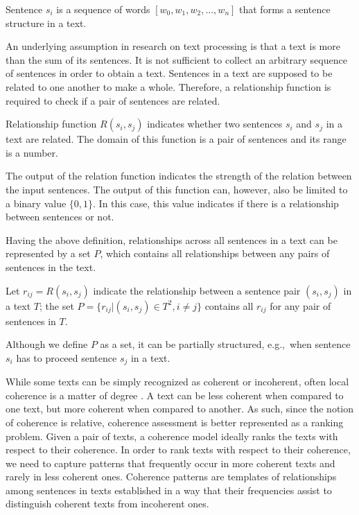 \begin{definition}
Sentence $s_i$ is a sequence of words $[w_0, w_1, w_2, ... , w_n]$ that forms a sentence structure in a text. 
\end{definition}

An underlying assumption in research on text processing is that a text is more than the sum of its sentences. 
It is not sufficient to collect an arbitrary sequence of sentences in order to obtain a text. 
Sentences in a text are supposed to be related to one another to make a whole. 
Therefore, a relationship function is required to check if a pair of sentences are related. 

\begin{definition}
Relationship function $R(s_i,s_j)$ indicates whether two sentences $s_i$ and $s_j$ in a text are related. 
The domain of this function is a pair of sentences and its range is a number. 
\end{definition} 

The output of the relation function indicates the strength of the relation between the input sentences.  
The output of this function can, however, also be limited to a binary value $\lbrace 0,1\rbrace$. 
In this case, this value indicates if there is a relationship between sentences or not. 

Having the above definition, relationships across all sentences in a text can be represented by a set $P$, which contains all relationships between any pairs of sentences in the text. 

\begin{definition}
Let $r_{ij}= R(s_i,s_j)$ indicate the relationship between a sentence pair $(s_i,s_j)$ in a text $T$; the set $P = \lbrace r_{ij}| (s_i,s_j) \in T^2, i \neq j \rbrace$ contains all $r_{ij}$ for any pair of sentences in $T$.
\end{definition}  

Although we define $P$ as a set, it can be partially structured, e.g.,\ when sentence $s_i$ has to proceed sentence $s_j$ in a text. 

While some texts can be simply recognized as coherent or incoherent, often local coherence is a matter of degree \cite{halliday76}. 
A text can be less coherent when compared to one text, but more coherent when compared to another. 
As such, since the notion of coherence is relative, coherence assessment is better represented as a ranking problem. 
Given a pair of texts, a coherence model ideally ranks the texts with respect to their coherence.
In order to rank texts with respect to their coherence, we need to capture patterns that frequently occur in more coherent texts and rarely in less coherent ones.  
Coherence patterns are templates of relationships among sentences in texts established in a way that their frequencies assist to distinguish coherent texts from incoherent ones. 

